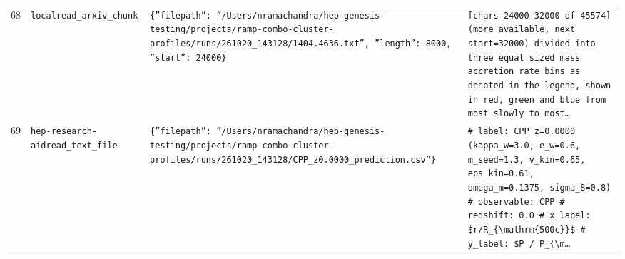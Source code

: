 \documentclass[11pt,a4paper]{article}
\begin{document}
\begin{longtable}{@{}p{}p{}p{}p{}@{}}
68 & \texttt{local}\newline\texttt{read\_\allowbreak{}arxiv\_\allowbreak{}chunk} & \texttt{\{''filepath'':\allowbreak{} ''/\allowbreak{}Users/\allowbreak{}nramachandra/\allowbreak{}hep-genesis-testing/\allowbreak{}projects/\allowbreak{}ramp-combo-cluster-profiles/\allowbreak{}runs/\allowbreak{}261020\_\allowbreak{}143128/\allowbreak{}1404.4636.txt'',\allowbreak{} ''length'':\allowbreak{} 8000,\allowbreak{} ''start'':\allowbreak{} 24000\}\allowbreak{}} & \texttt{[chars 24000-32000 of 45574]\allowbreak{} (more available,\allowbreak{} next start=\allowbreak{}32000)\allowbreak{}  divided into three equal sized mass accretion rate bins as denoted in the legend,\allowbreak{} shown in red,\allowbreak{} green and blue from most slowly to most\ldots{}\allowbreak{}} \\
69 & \texttt{hep-research-aid}\newline\texttt{read\_\allowbreak{}text\_\allowbreak{}file} & \texttt{\{''filepath'':\allowbreak{} ''/\allowbreak{}Users/\allowbreak{}nramachandra/\allowbreak{}hep-genesis-testing/\allowbreak{}projects/\allowbreak{}ramp-combo-cluster-profiles/\allowbreak{}runs/\allowbreak{}261020\_\allowbreak{}143128/\allowbreak{}CPP\_\allowbreak{}z0.0000\_\allowbreak{}prediction.csv''\}\allowbreak{}} & \texttt{\# label:\allowbreak{} CPP z=\allowbreak{}0.0000 (kappa\_\allowbreak{}w=\allowbreak{}3.0,\allowbreak{} e\_\allowbreak{}w=\allowbreak{}0.6,\allowbreak{} m\_\allowbreak{}seed=\allowbreak{}1.3,\allowbreak{} v\_\allowbreak{}kin=\allowbreak{}0.65,\allowbreak{} eps\_\allowbreak{}kin=\allowbreak{}0.61,\allowbreak{} omega\_\allowbreak{}m=\allowbreak{}0.1375,\allowbreak{} sigma\_\allowbreak{}8=\allowbreak{}0.8)\allowbreak{} \# observable:\allowbreak{} CPP \# redshift:\allowbreak{} 0.0 \# x\_\allowbreak{}label:\allowbreak{} \$r/\allowbreak{}R\_\allowbreak{}\{\textbackslash{}\allowbreak{}mathrm\{500c\}\allowbreak{}\}\allowbreak{}\$ \# y\_\allowbreak{}label:\allowbreak{} \$P /\allowbreak{} P\_\allowbreak{}\{\textbackslash{}\allowbreak{}m\ldots{}\allowbreak{}} \\

\end{longtable}
\end{document}
